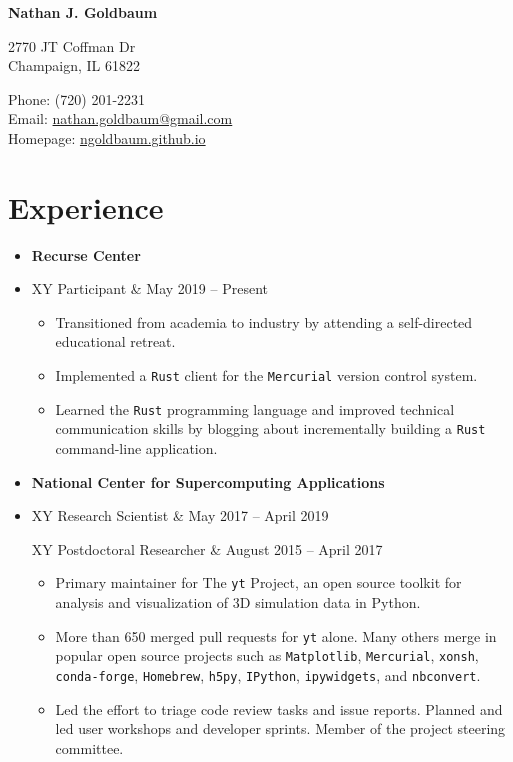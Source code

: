 \documentclass[10pt,letterpaper]{article}
\def\name{Nathan J. Goldbaum}
\newcommand{\textline}[2]{
  \begin{tabularx}{\textwidth}{XY}
  #1 & #2
  \end{tabularx}
}
\begin{document}
{\huge \bf \name}


\bigskip

\begin{minipage}[t]{0.6\textwidth}
  2770 JT Coffman Dr \\
  Champaign, IL 61822
\end{minipage}
\begin{minipage}[t]{0.4\textwidth}
  Phone: (720) 201-2231 \\  %
  Email: \href{mailto:nathan.goldbaum@gmail.com}{nathan.goldbaum@gmail.com} \\
  Homepage: \href{ngoldbaum.github.io}{ngoldbaum.github.io}
\end{minipage}

\section*{Experience}
\begin{itemize}
  \item [] {\bf Recurse Center}
  \item [] \textline{Participant}{May 2019 -- Present}
    \begin{itemize}
    \item Transitioned from academia to industry by attending a
      self-directed educational retreat.
    \item Implemented a \texttt{Rust} client for the \texttt{Mercurial} version
      control system.
    \item Learned the \texttt{Rust} programming language and improved technical
      communication skills by blogging about incrementally building a
      \texttt{Rust} command-line application.
    \end{itemize}    
    
  \item [] {\bf National Center for Supercomputing Applications}
  \item[] \textline{Research Scientist}{May 2017 -- April 2019} %
    \textline{Postdoctoral Researcher}{August 2015 -- April 2017} %
    \begin{itemize}
    \item Primary maintainer for The \texttt{yt} Project, an open source toolkit
      for analysis and visualization of 3D simulation data in Python.
    \item More than 650 merged pull requests for \texttt{yt} alone. Many
      others merge in popular open source projects such as
      \texttt{Matplotlib}, \texttt{Mercurial}, \texttt{xonsh},
      \texttt{conda-forge}, \texttt{Homebrew}, \texttt{h5py}, \texttt{IPython},
      \texttt{ipywidgets}, and \texttt{nbconvert}.
    \item Led the effort to triage code review tasks and issue reports. Planned
      and led user workshops and developer sprints. Member of the project
      steering committee.
    \end{itemize}
\end{itemize}
\end{document}
